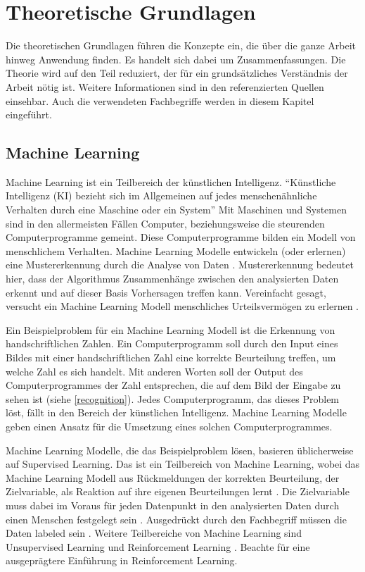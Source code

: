 \chapter{Theoretische Grundlagen}\label{chap:t}
Die theoretischen Grundlagen führen die Konzepte ein, die über die ganze Arbeit
hinweg Anwendung finden. Es handelt sich dabei um Zusammenfassungen. Die Theorie
wird auf den Teil reduziert, der für ein grundsätzliches Verständnis der Arbeit
nötig ist. Weitere Informationen sind in den referenzierten Quellen
einsehbar. Auch die verwendeten Fachbegriffe werden in diesem Kapitel
eingeführt. 

\section{Machine Learning}\label{chap:t_ml}
Machine Learning ist ein Teilbereich
der künstlichen Intelligenz. ``Künstliche Intelligenz (KI) bezieht sich im
Allgemeinen auf jedes menschenähnliche Verhalten durch eine Maschine oder ein
System'' \cite{noauthor_what_nodate} Mit Maschinen und Systemen sind in den
allermeisten Fällen Computer, beziehungsweise die steurenden Computerprogramme
gemeint. Diese Computerprogramme bilden ein Modell von menschlichem Verhalten.
Machine Learning Modelle entwickeln (oder erlernen) eine Mustererkennung durch
die Analyse von Daten \cite{noauthor_what_nodate-1}. Mustererkennung bedeutet hier,
dass der Algorithmus Zusammenhänge zwischen den analysierten Daten erkennt und
auf dieser Basis Vorhersagen treffen kann. Vereinfacht gesagt, versucht ein
Machine Learning Modell menschliches Urteilsvermögen zu erlernen \cite{spaulding_is_2020}.

Ein Beispielproblem für ein Machine Learning Modell ist die Erkennung von
handschriftlichen Zahlen. Ein Computerprogramm soll durch den Input eines Bildes
mit einer handschriftlichen Zahl eine korrekte Beurteilung treffen, um welche
Zahl es sich handelt. Mit anderen Worten soll der Output des Computerprogrammes
der Zahl entsprechen, die auf dem Bild der Eingabe zu sehen ist (siehe \autoref{recognition}). Jedes %
Computerprogramm, das dieses Problem löst, fällt in den Bereich der künstlichen
Intelligenz. Machine Learning Modelle geben einen Ansatz für die Umsetzung eines
solchen Computerprogrammes.


Machine Learning Modelle, die das Beispielproblem lösen, basieren üblicherweise
auf Supervised Learning. Das ist ein Teilbereich von Machine Learning, wobei das
Machine Learning Modell aus Rückmeldungen der korrekten Beurteilung, der
Zielvariable, als Reaktion auf ihre eigenen Beurteilungen lernt
\cite{noauthor_was_nodate-1}. Die Zielvariable muss dabei im Voraus für jeden
Datenpunkt in den analysierten Daten durch einen Menschen festgelegt sein
\cite{trahasch_31_nodate}. Ausgedrückt durch den Fachbegriff müssen die Daten
labeled sein \cite{noauthor_21_nodate}. Weitere Teilbereiche von Machine
Learning sind Unsupervised Learning und Reinforcement Learning
\cite{arora_supervised_2020}. Beachte  für eine ausgeprägtere
Einführung in Reinforcement Learning.

